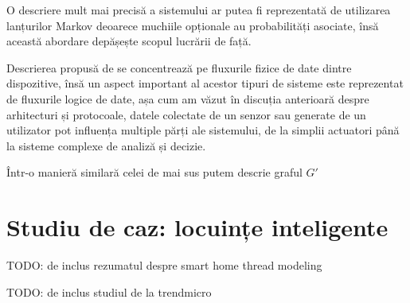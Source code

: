 
O descriere mult mai precisă a sistemului ar putea fi reprezentată de utilizarea lanțurilor Markov deoarece muchiile opționale au probabilități asociate, însă această abordare depășește scopul lucrării de față.

Descrierea propusă de \cite{Paduraru2021} se concentrează pe fluxurile fizice de date dintre dispozitive, însă un aspect important al acestor tipuri de sisteme este reprezentat de fluxurile logice de date, așa cum am văzut în discuția anterioară despre arhitecturi și protocoale, datele colectate de un senzor sau generate de un utilizator pot influența multiple părți ale sistemului, de la simplii actuatori până la sisteme complexe de analiză și decizie.


Într-o manieră similară celei de mai sus putem descrie graful $G'$


\section{Studiu de caz: locuințe inteligente}

TODO: de inclus rezumatul despre smart home thread modeling

TODO: de inclus studiul de la trendmicro
